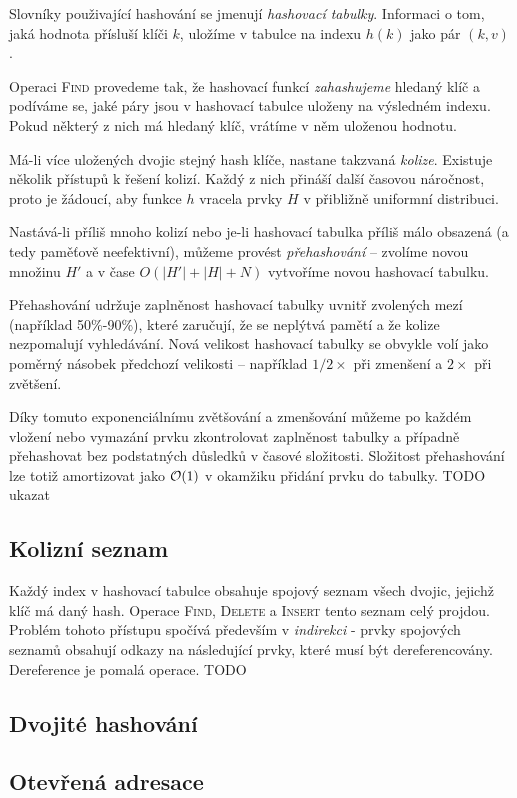 \documentclass[a4paper]{article}
\begin{document}
Slovníky použivající hashování se jmenují \textit{hashovací tabulky}.
Informaci o tom, jaká hodnota přísluší klíči $k$, uložíme
v tabulce na indexu $h(k)$ jako pár $(k,v)$.

Operaci \textsc{Find} provedeme tak, že hashovací funkcí \textit{zahashujeme}
hledaný klíč a podíváme se, jaké páry jsou v hashovací tabulce uloženy
na výsledném indexu. Pokud některý z nich má hledaný klíč, vrátíme v něm
uloženou hodnotu.

Má-li více uložených dvojic stejný hash klíče, nastane takzvaná \textit{kolize}.
Existuje několik přístupů k řešení kolizí. Každý z nich přináší další
časovou náročnost, proto je žádoucí, aby funkce $h$ vracela prvky $H$
v přibližně uniformní distribuci.

Nastává-li příliš mnoho kolizí nebo je-li hashovací tabulka příliš málo
obsazená (a tedy paměťově neefektivní), můžeme provést \textit{přehashování} --
zvolíme novou množinu $H'$ a v čase $O(|H'|+|H|+N)$ vytvoříme novou hashovací
tabulku.

Přehashování udržuje zaplněnost hashovací tabulky uvnitř zvolených mezí
(například 50\%-90\%), které zaručují, že se neplýtvá pamětí a že kolize
nezpomalují vyhledávání.
Nová velikost hashovací tabulky se obvykle volí jako poměrný násobek předchozí
velikosti -- například $1/2\times$ při zmenšení a $2\times$ při zvětšení.

Díky tomuto exponenciálnímu zvětšování a zmenšování můžeme po každém vložení
nebo vymazání prvku zkontrolovat zaplněnost tabulky a případně přehashovat bez
podstatných důsledků v časové složitosti. Složitost přehashování lze totiž
amortizovat jako $\mathcal{O}(1)$ v okamžiku přidání prvku do tabulky.
TODO ukazat

\subsection{Kolizní seznam}
Každý index v hashovací tabulce obsahuje spojový seznam všech dvojic, jejichž
klíč má daný hash. Operace \textsc{Find}, \textsc{Delete} a \textsc{Insert}
tento seznam celý projdou. Problém tohoto přístupu spočívá především v
\textit{indirekci} - prvky spojových seznamů obsahují odkazy
na následující prvky, které musí být dereferencovány. Dereference
je pomalá operace. TODO

\subsection{Dvojité hashování}
\subsection{Otevřená adresace}
\end{document}
